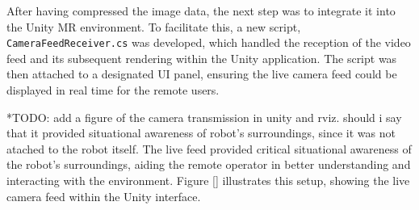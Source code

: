 After having compressed the image data, the next step was to integrate it into the Unity \ac{MR} environment. To facilitate this, a new script, \texttt{CameraFeedReceiver.cs} was developed, which handled the reception of the video feed and its subsequent rendering within the Unity application. The script was then attached to a designated \ac{UI} panel, ensuring the live camera feed could be displayed in real time for the remote users. 

*TODO: add a figure of the camera transmission in unity and rviz. should i say that it provided situational awareness of robot's surroundings, since it was not atached to the robot itself. 
The live feed provided critical situational awareness of the robot’s surroundings, aiding the remote operator in better understanding and interacting with the environment. Figure \ref{} illustrates this setup, showing the live camera feed within the Unity interface.









